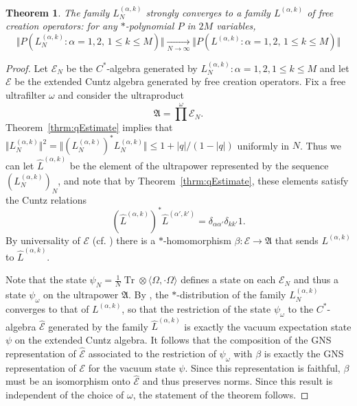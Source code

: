 \documentclass[11pt]{article}
\newtheorem{theorem}{Theorem}
\begin{document}
\begin{theorem}
    The family $L_N^{(\alpha,k)}$ strongly converges to a family $L^{(\alpha,k)}$ of free creation operators: for any $*$-polynomial $P$ in $2M$ variables, 
    $$
     \Vert P(L_N^{(\alpha,k)} : \alpha=1,2,\,  1\leq k\leq M)\Vert  
    \xrightarrow[N \to \infty]{} \Vert P(L^{(\alpha,k)}: \alpha=1,2,\, 1\leq k\leq M)\Vert$$
\end{theorem}
\begin{proof}
      Let $\mathscr{E}_N$ be the $C^*$-algebra generated by $L_N^{(\alpha,k)} : \alpha=1,2, 1\leq k\leq M$ and let $\mathscr{E}$ be the extended Cuntz algebra  generated by free creation operators. Fix a free ultrafilter $\omega$ and consider the ultraproduct
      $$\mathfrak{A} = {\prod}^\omega \mathscr{E}_N.$$ Theorem~\ref{thrm:qEstimate} implies that $\Vert L_N^{(\alpha,k)}\Vert^2 = \Vert (L_N^{(\alpha,k)})^* L_N^{(\alpha,k)}\Vert \leq 1 + |q|/(1-|q|) $ uniformly in $N$.
      Thus we can let $\hat{L}^{(\alpha,k)}$ be the element of the ultrapower represented by the sequence $(L_N^{(\alpha,k)})_N$, and note that by Theorem~\ref{thrm:qEstimate}, these elements satisfy the Cuntz relations $$ (\hat{L}^{(\alpha,k)} )^* \hat{L}^{(\alpha',k')} = \delta_{\alpha\alpha'}\delta_{kk'} 1. $$ By universality of $\mathscr{E}$ (cf. \cite{Cuntz,Evans:OnOn}) there is a $*$-homomorphism $\beta:\mathscr{E}\to \mathfrak{A}$ that sends $L^{(\alpha,k)}$ to $\hat{L}^{(\alpha,k)}$. 
      
      Note that the state  $\psi_N = \frac{1}{N}\operatorname{Tr} \otimes \langle \Omega,\cdot\Omega\rangle $ defines a state on each $\mathscr{E}_N$ and thus a state $\psi_\omega $ on the ultrapower $\mathfrak{A}$. 
      By \cite{Shlyakhtenko:Matrices}, the $*$-distribution of the family $L_N^{(\alpha,k)}$ converges to that of $L^{(\alpha,k)}$, 
      so that the restriction of the state $\psi_\omega$ to the $C^*$-algebra $\hat{\mathscr{E}}$ 
      generated by the family $\hat{L}^{(\alpha,k)}$ is exactly the vacuum expectation state $\psi$ on the extended Cuntz algebra.  It follows that the composition of  the GNS representation of $\hat{\mathscr{E}}$ associated to the restriction of $\psi_\omega$ with $\beta$ is exactly the GNS representation of $\mathscr{E}$ for the vacuum state $\psi$. Since this representation is faithful, $\beta$ must be an isomorphism onto $\hat{\mathscr{E}}$ and thus preserves norms.  Since this result is independent of the choice of $\omega$, the statement of the theorem follows. 
      \end{proof}
\end{document}

